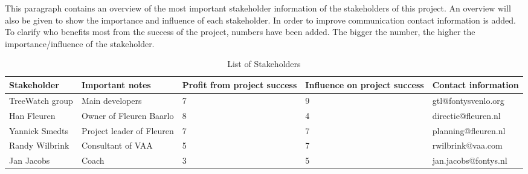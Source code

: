 This paragraph contains an overview of the most important stakeholder information of the stakeholders of this project. An overview will also be given to show the importance and influence of each stakeholder. In order to improve communication contact information is added. To clarify who benefits most from the success of the project, numbers have been added. The bigger the number, the higher the importance/influence of the stakeholder.

\begin{table}[htbp]
\label{stakeholders}
{
\begin{tabular}{ p{}  p{3cm}  p{}  p{}  p{} }
	Stakeholder & Important notes & Profit from project success & Influence on project success & Contact information \\\hline
	TreeWatch group & Main developers & 7 & 9 & gtl@fontysvenlo.org \\
	Han Fleuren & Owner of Fleuren Baarlo & 8 & 4 & directie@fleuren.nl \\
	Yannick Smedts & Project leader of Fleuren & 7 & 7 & planning@fleuren.nl \\
	Randy Wilbrink & Consultant of VAA & 5 & 7 & rwilbrink@vaa.com \\
	Jan Jacobs & Coach & 3 & 5 & jan.jacobs@fontys.nl \\

\end{tabular}}
\caption{List of Stakeholders}
\end{table}
